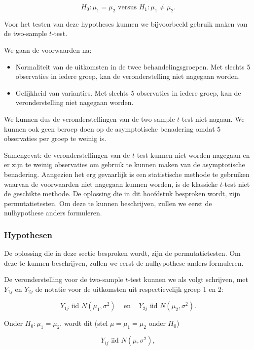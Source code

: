 \documentclass[
  12pt,dutch,coursenotes]{book}
\providecommand{\tightlist}{%
  \setlength{\itemsep}{0pt}\setlength{\parskip}{0pt}}
\theoremstyle{definition}
\theoremstyle{definition}
\theoremstyle{definition}
\theoremstyle{remark}
\begin{document}
\[H_0: \mu_1=\mu_2 \text{ versus } H_1: \mu_1\neq \mu_2.\]

Voor het testen van deze hypotheses kunnen we bijvoorbeeld gebruik maken van de two-sample \(t\)-test.

We gaan de voorwaarden na:

\begin{itemize}
\tightlist
\item
  Normaliteit van de uitkomsten in de twee behandelingsgroepen. Met slechts 5 observaties in iedere groep, kan de veronderstelling niet nagegaan worden.
\item
  Gelijkheid van varianties. Met slechts 5 observaties in iedere groep, kan de veronderstelling niet nagegaan worden.
\end{itemize}

We kunnen dus de veronderstellingen van de two-sample \(t\)-test niet nagaan.
We kunnen ook geen beroep doen op de asymptotische benadering omdat 5 observaties per groep te weinig is.

Samengevat: de veronderstellingen van de \(t\)-test kunnen niet worden nagegaan en er zijn te weinig observaties om gebruik te kunnen maken van de asymptotische benadering. Aangezien het erg gevaarlijk is een statistische methode te gebruiken waarvan de voorwaarden niet nagegaan kunnen worden, is de klassieke \(t\)-test niet de geschikte methode. De oplossing die in dit hoofdstuk besproken wordt, zijn permutatietesten.
Om deze te kunnen beschrijven, zullen we eerst de nulhypothese anders formuleren.

\hypertarget{hypothesen}{%
\subsubsection{Hypothesen}\label{hypothesen}}

De oplossing die in deze sectie besproken wordt, zijn de permutatietesten.
Om deze te kunnen beschrijven, zullen we eerst de nulhypothese anders formuleren.

De veronderstelling voor de two-sample \(t\)-test kunnen we als volgt schrijven, met \(Y_{1j}\) en \(Y_{2j}\) de notatie voor de uitkomsten uit respectievelijk groep 1 en 2:

\[Y_{1j} \text{ iid } N(\mu_1,\sigma^2) \;\;\;\text{ en }\;\;\; Y_{2j} \text{ iid } N(\mu_2,\sigma^2).\]

Onder \(H_0:\mu_1=\mu_2\), wordt dit (stel \(\mu=\mu_1=\mu_2\) onder \(H_0\))

\[ Y_{ij} \text{ iid } N(\mu,\sigma^2),\]
\end{document}
